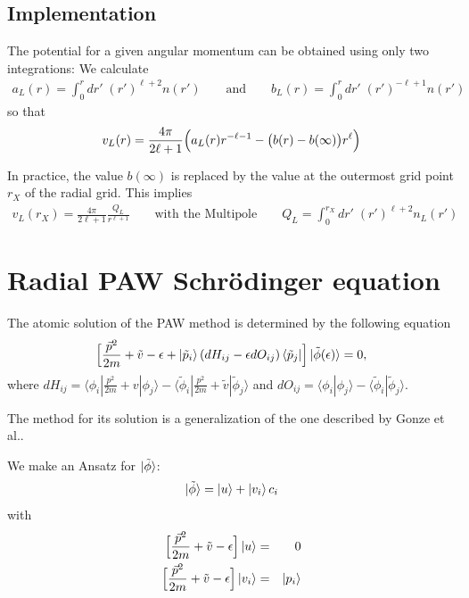 \documentclass[11pt,a4paper]{report}
\begin{document}
\subsection{Implementation}
The potential for a given angular momentum can be obtained using only
two integrations:  We calculate
\begin{eqnarray}
a_L(r)=\int_0^rdr'\;(r')^{\ell+2}n(r')
\qquad\text{and}\qquad
b_L(r)=\int_0^rdr'\;(r')^{-\ell+1}n(r')
\end{eqnarray}
so that
\begin{eqnarray}
v_L(r)=\frac{4\pi}{2\ell+1}
\Bigl(
a_L(r)r^{-\ell-1}-\bigl(b(r)-b(\infty)\bigr)r^\ell\Bigr)
\end{eqnarray}

In practice, the value $b(\infty)$ is replaced by the value at the
outermost grid point $r_X$ of the radial grid. This implies
\begin{eqnarray}
v_L(r_X)=\frac{4\pi}{2\ell+1}\frac{Q_L}{r^{\ell+1}}
\qquad\text{with the Multipole}\qquad
Q_L=\int_0^{r_X} dr'\;(r')^{\ell+2}n_L(r')
\end{eqnarray}



\section{Radial PAW Schr\"odinger equation}
The atomic solution of the PAW method is determined by the following
equation
\begin{equation}
\Bigl\lbrack
\frac{\vec{p}^2}{2m}+\tilde{v}-\epsilon
+\ket{\tilde{p}_i}(dH_{ij} - \epsilon dO_{ij}) \bra{\tilde{p}_j}
\Bigr\rbrack
\ket{\tilde{\phi}(\epsilon)} = 0,
\label{eq:pawradeq}
\end{equation}
where
$dH_{ij}=\langle\phi_i|\frac{p^2}{2m}+ v|\phi_j\rangle
- \langle\tilde{\phi}_i|\frac{p^2}{2m} + \tilde{v}|\tilde{\phi}_j\rangle$
and $dO_{ij}=\langle\phi_i|\phi_j\rangle-
\langle\tilde{\phi}_i|\tilde{\phi}_j\rangle$.

The method for its solution is a generalization of the one described
by Gonze et al.\cite{gonze91_prb44_8503}.

We make an Ansatz for $\ket{\tilde{\phi}}$:
\begin{equation}
\ket{\tilde{\phi}}=\ket{u}+\ket{v_i}c_i
\label{eq:pawradeqansatz}
\end{equation}
with
\begin{eqnarray}
\Bigl\lbrack
\frac{\vec{p}^2}{2m}+\tilde{v}-\epsilon
\Bigr\rbrack \ket{u} &=& 0
\\
\Bigl\lbrack
\frac{\vec{p}^2}{2m}+\tilde{v}-\epsilon
\Bigr\rbrack \ket{v_i}& =& \ket{p_i}
\end{eqnarray}
\end{document}
